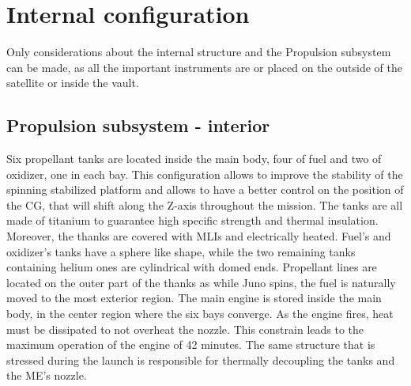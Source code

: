 \section{Internal configuration}
\label{sec:internal_config}

Only considerations about the internal structure and the Propulsion subsystem can be made, as all the important instruments are or placed on the outside of the satellite or inside the vault.

\subsection{Propulsion subsystem - interior} 
\label{subsec:prop_sub_int}

Six propellant tanks are located inside the main body, four of fuel and two of oxidizer, one in each bay. This configuration allows to improve the stability of the spinning stabilized platform and allows to have a better control on the position of the CG, that will shift along the Z-axis throughout the mission. The tanks are all made of titanium to guarantee high specific strength and thermal insulation. Moreover, the thanks are covered with MLIs and electrically heated. Fuel's and oxidizer's tanks have a sphere like shape, while the two remaining tanks containing helium ones are cylindrical with domed ends. Propellant lines are located on the outer part of the thanks as while Juno spins, the fuel is naturally moved to the most exterior region. The main engine is stored inside the main body, in the center region where the six bays converge. As the engine fires, heat must be dissipated to not overheat the nozzle. This constrain leads to the maximum operation of the engine of 42 minutes.\cite{Leros} The same structure that is stressed during the launch is responsible for thermally decoupling the tanks and the ME's nozzle. 

